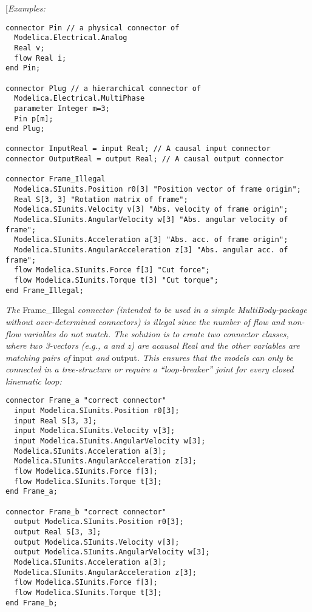 {[}\emph{Examples:}

\begin{lstlisting}[language=modelica]
connector Pin // a physical connector of
  Modelica.Electrical.Analog
  Real v;
  flow Real i;
end Pin;

connector Plug // a hierarchical connector of
  Modelica.Electrical.MultiPhase
  parameter Integer m=3;
  Pin p[m];
end Plug;

connector InputReal = input Real; // A causal input connector
connector OutputReal = output Real; // A causal output connector

connector Frame_Illegal
  Modelica.SIunits.Position r0[3] "Position vector of frame origin";
  Real S[3, 3] "Rotation matrix of frame";
  Modelica.SIunits.Velocity v[3] "Abs. velocity of frame origin";
  Modelica.SIunits.AngularVelocity w[3] "Abs. angular velocity of frame";
  Modelica.SIunits.Acceleration a[3] "Abs. acc. of frame origin";
  Modelica.SIunits.AngularAcceleration z[3] "Abs. angular acc. of frame";
  flow Modelica.SIunits.Force f[3] "Cut force";
  flow Modelica.SIunits.Torque t[3] "Cut torque";
end Frame_Illegal;
\end{lstlisting}

\emph{The} Frame\_Illegal \emph{connector (intended to be used in a
simple MultiBody-package without over-determined connectors) is illegal
since the number of flow and non-flow variables do not match. The
solution is to create two connector classes, where two 3-vectors (e.g.,
a and z) are acausal Real and the other variables are matching pairs of}
input \emph{and} output\emph{. This ensures that the models can only be
connected in a tree-structure or require a ``loop-breaker'' joint for
every closed kinematic loop:}

\begin{lstlisting}[language=modelica]
connector Frame_a "correct connector"
  input Modelica.SIunits.Position r0[3];
  input Real S[3, 3];
  input Modelica.SIunits.Velocity v[3];
  input Modelica.SIunits.AngularVelocity w[3];
  Modelica.SIunits.Acceleration a[3];
  Modelica.SIunits.AngularAcceleration z[3];
  flow Modelica.SIunits.Force f[3];
  flow Modelica.SIunits.Torque t[3];
end Frame_a;

connector Frame_b "correct connector"
  output Modelica.SIunits.Position r0[3];
  output Real S[3, 3];
  output Modelica.SIunits.Velocity v[3];
  output Modelica.SIunits.AngularVelocity w[3];
  Modelica.SIunits.Acceleration a[3];
  Modelica.SIunits.AngularAcceleration z[3];
  flow Modelica.SIunits.Force f[3];
  flow Modelica.SIunits.Torque t[3];
end Frame_b;
\end{lstlisting}

